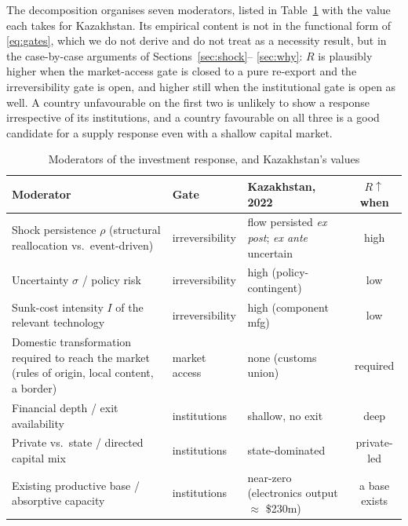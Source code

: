 \documentclass[12pt]{article}
\begin{document}
The decomposition organises seven moderators, listed in
Table~\ref{tab:moderators} with the value each takes for Kazakhstan. Its empirical content is
not in the functional form of \eqref{eq:gates}, which we do not derive and do not treat as a
necessity result, but in the case-by-case arguments of Sections~\ref{sec:shock}--%
\ref{sec:why}: $R$ is plausibly higher when the market-access gate is closed to a pure
re-export and the irreversibility gate is open, and higher still when the institutional gate is
open as well. A country unfavourable on the first two is unlikely to show a response
irrespective of its institutions, and a country favourable on all three is a good candidate for
a supply response even with a shallow capital market.

\begin{table}[t]
\centering
\caption{Moderators of the investment response, and Kazakhstan's values}
\label{tab:moderators}
\small
\begin{tabular}{@{}p{5.4cm}p{2.3cm}p{3.1cm}c@{}}
\toprule
Moderator & Gate & Kazakhstan, 2022 & $R\!\uparrow$ when \\
\midrule
Shock persistence $\rho$ (structural reallocation vs.\ event-driven) & irreversibility & flow persisted \emph{ex post}; \emph{ex ante} uncertain & high \\
Uncertainty $\sigma$ / policy risk & irreversibility & high (policy-contingent) & low \\
Sunk-cost intensity $I$ of the relevant technology & irreversibility & high (component mfg) & low \\
Domestic transformation required to reach the market (rules of origin, local content, a border) & market access & none (customs union) & required \\
Financial depth / exit availability & institutions & shallow, no exit & deep \\
Private vs.\ state / directed capital mix & institutions & state-dominated & private-led \\
Existing productive base / absorptive capacity & institutions & near-zero (electronics output $\approx$ \$230m) & a base exists \\
\bottomrule
\end{tabular}
\end{table}
\end{document}
